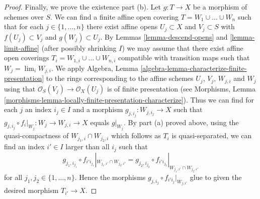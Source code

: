 \documentclass[10pt,a4paper]{amsart}
\theoremstyle{plain}
\theoremstyle{definition}
\theoremstyle{remark}
\numberwithin{equation}{subsection}
\def\lim{\mathop{\mathrm{lim}}\nolimits}
\begin{document}
\begin{proof}
\medskip\noindent
Finally, we prove the existence part (b).
Let $g : T \to X$ be a morphism of schemes over $S$.
We can find a finite affine open covering
$T = W_1 \cup \ldots \cup W_n$ such that for
each $j \in \{1, \ldots, n\}$ there exist affine opens
$U_j \subset X$ and $V_j \subset S$ with $f(U_j) \subset V_j$
and $g(W_j) \subset U_j$. By Lemmas \ref{lemma-descend-opens}
and \ref{lemma-limit-affine}
(after possibly shrinking $I$) we may assume that
there exist affine open coverings $T_i = W_{1, i} \cup \ldots \cup W_{n, i}$
compatible with transition maps such that $W_j = \lim_i W_{j, i}$.
We apply Algebra, Lemma \ref{algebra-lemma-characterize-finite-presentation}
to the rings corresponding to the affine schemes $U_j$, $V_j$, $W_{j, i}$ and
$W_j$ using that $\mathcal{O}_S(V_j) \to \mathcal{O}_X(U_j)$ is of finite
presentation (see Morphisms,
Lemma \ref{morphisms-lemma-locally-finite-presentation-characterize}).
Thus we can find for each $j$ an index $i_j \in I$ and a morphism
$g_{j, i_j} : W_{j, i_j} \to X$ such that
$g_{j, i_j} \circ f_i|_{W_j} : W_j \to W_{j, i} \to X$
equals $g|_{W_j}$. By part (a) proved above, using the quasi-compactness of
$W_{j_1, i} \cap W_{j_2, i}$ which follows as $T_i$ is quasi-separated,
we can find an index $i' \in I$ larger than all $i_j$ such that
$$
g_{j_1, i_{j_1}} \circ f_{i'i_{j_1}}|_{W_{j_1, i'} \cap W_{j_2, i'}} =
g_{j_2, i_{j_2}} \circ f_{i'i_{j_2}}|_{W_{j_1, i'} \cap W_{j_2, i'}}
$$
for all $j_1, j_2 \in \{1, \ldots, n\}$. Hence the morphisms
$g_{j, i_j} \circ f_{i'i_j}|_{W_{j, i'}}$ glue to given the
desired morphism $T_{i'} \to X$.
\end{proof}
\end{document}
